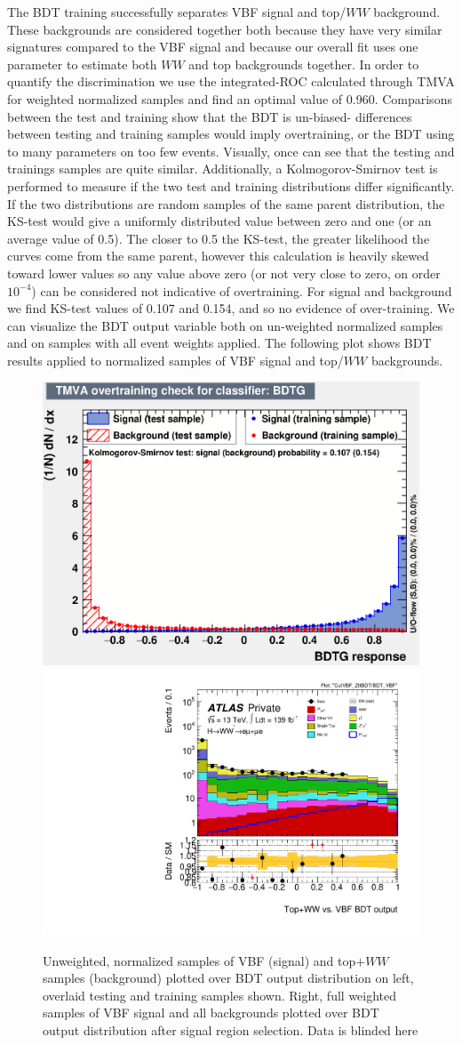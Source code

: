 The BDT training successfully separates VBF signal and top/$WW$ background. These backgrounds are considered together both because they have very similar signatures compared to the VBF signal and because our overall fit uses one parameter to estimate both $WW$ and top backgrounds together. In order to quantify the discrimination we use the integrated-ROC calculated through TMVA for weighted normalized samples and find an optimal value of 0.960. Comparisons between the test and training show that the BDT is un-biased- differences between testing and training samples would imply overtraining, or the BDT using to many parameters on too few events. Visually, once can see that the testing and trainings samples are quite similar. Additionally, a Kolmogorov-Smirnov test is performed to measure if the two test and training distributions differ significantly. If the two distributions are random samples of the same parent distribution, the KS-test would give a uniformly distributed value between zero and one (or an average value of 0.5). The closer to 0.5 the KS-test, the greater likelihood the curves come from the same parent, however this calculation is heavily skewed toward lower values so any value above zero (or not very close to zero, on order $10^{-4}$) can be considered not indicative of overtraining. For signal and background we find KS-test values of 0.107 and 0.154, and so no evidence of over-training. We can visualize the BDT output variable both on un-weighted normalized samples and on samples with all event weights applied. The following plot shows BDT results applied to normalized samples of VBF signal and top/$WW$ backgrounds.

\begin{figure}[!htbp]
\centering
  \includegraphics[width=.45\linewidth]{Pictures/VBFvsWW+Top/overtrain_BDTG.eps}
  \includegraphics[width=.35\linewidth]{Pictures/run2-emme-CutVBF_ZttBDT-BDT_VBF-log.pdf}
\caption{Unweighted, normalized samples of VBF (signal) and top$+WW$ samples (background) plotted over BDT output distribution on left, overlaid testing and training samples shown. Right, full weighted samples of VBF signal and all backgrounds plotted over BDT output distribution after signal region selection. Data is blinded here}
\label{fig:SRBDTresult}
\end{figure}

